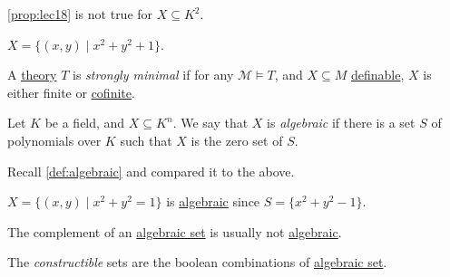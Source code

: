 \begin{remark}
	\autoref{prop:lec18} is not true for \(X \subseteq K^2\).
\end{remark}
\begin{explanation}
	\(X = \{ (x, y) \mid x^2 + y^2 + 1 \} \).
\end{explanation}

\begin{definition}\label{def:strongly-minimal}
	A \hyperref[def:theory]{theory} \(T\) is \emph{strongly minimal} if for any \(\mathcal{M} \models T\), and \(X \subseteq M\) \hyperref[def:definable]{definable}, \(X\) is either finite or \hyperref[def:cofinite]{cofinite}.
\end{definition}

\begin{definition}[Algebraic]\label{def:algebraic-set}
	Let \(K\) be a field, and \(X \subseteq K^n\). We say that \(X\) is \emph{algebraic} if there is a set \(S\) of polynomials over \(K\) such that \(X\) is the zero set of \(S\).
\end{definition}

\begin{prev}
	Recall \autoref{def:algebraic} and compared it to the above.
\end{prev}

\begin{eg}
	\(X = \{(x, y) \mid x^2 + y^2 = 1\}\) is \hyperref[def:algebraic]{algebraic} since \(S = \{ x^2 + y^2 -1 \} \).
\end{eg}

The complement of an \hyperref[def:algebraic-set]{algebraic set} is usually not \hyperref[def:algebraic-set]{algebraic}.

\begin{definition}[Constructible]\label{def:constructible}
	The \emph{constructible} sets are the boolean combinations of \hyperref[def:algebraic-set]{algebraic set}.
\end{definition}


